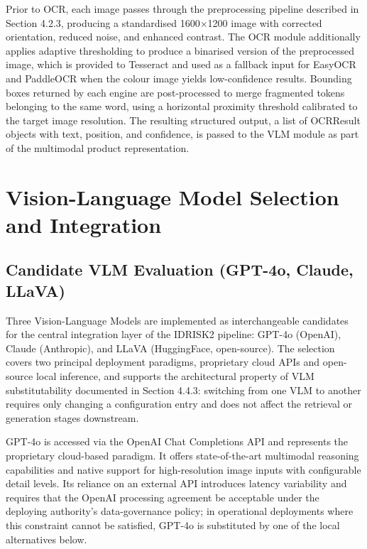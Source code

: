 Prior to OCR, each image passes through the preprocessing pipeline described in Section 4.2.3, producing a standardised 1600\(\times\)1200 image with corrected orientation, reduced noise, and enhanced contrast. The OCR module additionally applies adaptive thresholding to produce a binarised version of the preprocessed image, which is provided to Tesseract and used as a fallback input for EasyOCR and PaddleOCR when the colour image yields low-confidence results. Bounding boxes returned by each engine are post-processed to merge fragmented tokens belonging to the same word, using a horizontal proximity threshold calibrated to the target image resolution. The resulting structured output, a list of OCRResult objects with text, position, and confidence, is passed to the VLM module as part of the multimodal product representation.

\hypertarget{vision-language-model-selection-and-integration}{%
\section{Vision-Language Model Selection and Integration}\label{vision-language-model-selection-and-integration}}

\hypertarget{candidate-vlm-evaluation-gpt-4o-claude-llava}{%
\subsection{Candidate VLM Evaluation (GPT-4o, Claude, LLaVA)}\label{candidate-vlm-evaluation-gpt-4o-claude-llava}}

Three Vision-Language Models are implemented as interchangeable candidates for the central integration layer of the IDRISK2 pipeline: GPT-4o (OpenAI), Claude (Anthropic), and LLaVA (HuggingFace, open-source). The selection covers two principal deployment paradigms, proprietary cloud APIs and open-source local inference, and supports the architectural property of VLM substitutability documented in Section 4.4.3: switching from one VLM to another requires only changing a configuration entry and does not affect the retrieval or generation stages downstream.

GPT-4o is accessed via the OpenAI Chat Completions API and represents the proprietary cloud-based paradigm. It offers state-of-the-art multimodal reasoning capabilities and native support for high-resolution image inputs with configurable detail levels. Its reliance on an external API introduces latency variability and requires that the OpenAI processing agreement be acceptable under the deploying authority's data-governance policy; in operational deployments where this constraint cannot be satisfied, GPT-4o is substituted by one of the local alternatives below.

